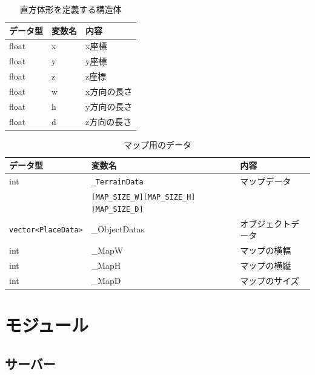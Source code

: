 \documentclass{jarticle}
\begin{document}
\begin{table}[H]
    \caption{直方体形を定義する構造体}
    \label{table:data4}
    \begin{center}
    \begin{tabular}{|l||l|l|}\hline
    データ型 & 変数名 & 内容　\\ \hline
    float & x & x座標 \\ \hline
    float & y & y座標 \\ \hline
    float & z & z座標 \\ \hline
    float & w & x方向の長さ \\ \hline
    float & h & y方向の長さ \\ \hline
    float & d & z方向の長さ \\ \hline
    \end{tabular}
    \end{center}
\end{table}
\begin{table}[H]
    \caption{マップ用のデータ}
    \label{table:data5}
    \centering
    \begin{tabular}{|l||l|l|}\hline
    データ型 & 変数名 & 内容 \\ \hline
    int & \verb+_TerrainData+  & マップデータ \\
    & \verb+[MAP_SIZE_W][MAP_SIZE_H][MAP_SIZE_D]+ & \\ \hline
    \verb+vector<PlaceData>+ & \_ObjectDatas & オブジェクトデータ \\ \hline
    int & \_MapW & マップの横幅 \\ \hline
    int & \_MapH & マップの横縦 \\ \hline
    int & \_MapD & マップのサイズ \\ \hline
    \end{tabular}
\end{table}

\section{モジュール}
\subsection{サーバー}
\end{document}

